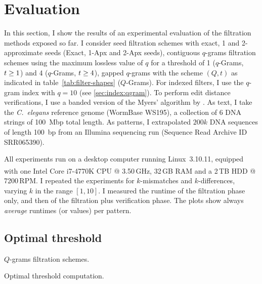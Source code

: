 
\section{Evaluation}
\label{sec:filtering:evaluation}

In this section, I show the results of an experimental evaluation of the filtration methods exposed so far.
I consider seed filtration schemes with exact, 1 and 2-approximate seeds (Exact, 1-Apx and 2-Apx seeds), contiguous $q$-grams filtration schemes using the maximum lossless value of $q$ for a threshold of 1 ($q$-Grams, $t \geq 1$) and 4 ($q$-Grams, $t \geq 4$), gapped $q$-grams with the scheme $(Q,t)$ as indicated in table~\ref{tab:filter-shapes} ($Q$-Grams).
For indexed filters, I use the $q$-gram index with $q=10$ (see \ref{sec:index:qgram}).
To perform edit distance verifications, I use a banded version of the Myers' algorithm \citep{Myers1999} by \citep{Weese2012}.
As text, I take the \emph{C.~elegans} reference genome (WormBase WS195), \ie a collection of 6 DNA strings of 100~Mbp total length.
As patterns, I extrapolated $200k$ DNA sequences of length 100~bp from an Illumina sequencing run (Sequence Read Archive ID SRR065390).

All experiments run on a desktop computer running Linux~3.10.11, equipped with one Intel\textsuperscript{\textregistered} Core i7-4770K CPU @ 3.50\,GHz, 32\,GB RAM and a 2\,TB HDD @ 7200\,RPM.
I repeated the experiments for $k$-mismatches and $k$-differences, varying $k$ in the range $[1,10]$.
I measured the runtime of the filtration phase only, and then of the filtration plus verification phase.
The plots show always \emph{average} runtimes (or values) per pattern.

\subsection{Optimal threshold}

\begin{table}[h]
  \center
  \caption[$Q$-grams filtration schemes]{$Q$-grams filtration schemes.}
\label{tab:shapes}
\end{table}

\begin{table}[h]
  \center
  \caption[Optimal threshold computation]{Optimal threshold computation.}
%		
%		
%		
%		
\label{tab:threshold}
\end{table}

